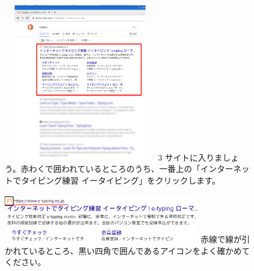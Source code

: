 \documentclass[a4paper,12pt]{jarticle}
\begin{document}
\begin{figure}[t]
  \begin{minipage}{6.582cm}
    \includegraphics[width=6.796cm,height=7.029cm]{textbook-img086.png}
    3 サイトに入りましょう。赤わくで囲われているところのうち、一番上の「インターネットでタイピング練習 イータイピング」をクリックします。
  \end{minipage}
  \begin{minipage}{8.482cm}
    \includegraphics[width=8.714cm,height=2.163cm]{textbook-img085.png}
    赤線で線が引かれているところ、黒い四角で囲んであるアイコンをよく確かめてください。
  \end{minipage}






  \centering



\end{figure}
\clearpage
\end{document}
